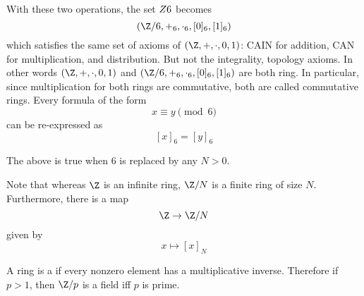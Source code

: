 With these two operations, the set $Z\/6$ becomes
\[
(\Z/6, +_6, \cdot_6, [0]_6, [1]_6)
\]
which satisfies the same set of axioms of $(\Z, +, \cdot, 0, 1)$:
CAIN for addition,
CAN for multiplication, and distribution.
But not the integrality, topology axioms.
In other words
$(\Z, +, \cdot, 0, 1)$ and 
$(\Z/6, +_6, \cdot_6, [0]_6, [1]_6)$
are both ring.
In particular, since multiplication for both rings are commutative,
both are called commutative rings.
Every formula of the form
\[
x \equiv y \pmod{6}
\]
can be re-expressed as
\[
[x]_6 = [y]_6
\]

The above is true when $6$ is replaced by any $N > 0$.

Note that whereas $\Z$ is an infinite ring, $\Z/N$ is a finite
ring of size $N$.
Furthermore, there is a map
\[
\Z \rightarrow \Z/N
\]
given by
\[
x \mapsto [x]_N
\]

A ring is a 
if every nonzero element has a multiplicative inverse.
Therefore if $p > 1$, then $\Z/p$ is a field iff $p$ is prime.

